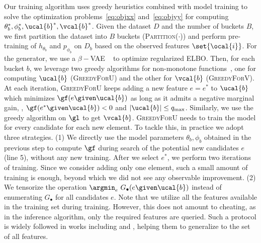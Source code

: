 \documentclass[letterpaper]{article}
\renewcommand{\cite}{\citep}
\begin{document}

Our training algorithm uses greedy heuristics combined with model training to solve the optimization problems~\eqref{eq:objxx} and~\eqref{eq:objyy} for computing $\theta_b ^*, \phi_b ^*, \ucal{b} ^*, \vcal{b}^*$. Given the dataset $D$ and the number of buckets $B$, we first partition the dataset into $B$ buckets (\textsc{Partition}($\cdot$)) and perform pre-training of $h_{\theta_b}$ and $p_{\phi_b}$
on $D_b$ based on the observed features $\set{\ocal{i}}$. For the generator, we use a $\beta-$VAE ~\cite{higgins2017beta} to optimize regularized ELBO.
Then, for each bucket $b$, we leverage two greedy algorithms for non-monotone functions~\cite{mualem2022using,harshaw2019submodular},  one for computing $\ucal{b}$ (\textsc{GreedyForU}) and the other for $\vcal{b}$ (\textsc{GreedyForV}). At each iteration, \textsc{GreedyForU} keeps adding a new feature $e=e^*$ to $\ucal{b}$ which minimizes $\gf(e\given\ucal{b})$ as long as it admits a negative marginal gain, \ie, $\gf( e^* \given \ucal{b})< 0$ and $|\ucal{b}| \le q_{\max}$. Similarly, we use the greedy algorithm on $\gl$ to get $\vcal{b}$. \textsc{GreedyForU} needs to train the model for every candidate for each new element. To tackle this, in practice we adopt three strategies. (1) We directly use the model parameters $\theta_b , \phi_b $ obtained in the previous step  to compute $\gf$ during search of the potential new candidates $e$ (line 5), without any new training. After we select $e^*$, we perform two iterations of training. Since we consider adding only one element, such a small amount of training is enough, beyond which we did not see any observable improvement.
(2) We tensorize the operation $\argmin_e \ G_{\bullet}(e\given\ucal{b})$ instead of enumerating $G_{\bullet}$ for all candidates $e$. Note that we utilize all the features available in the training set during training. However, this does not amount to cheating, as in the inference algorithm, only the required features are queried. Such a protocol is widely followed in works including \cite{acflow} and \cite{eddi}, helping them to generalize to the set of all features.
\end{document}
